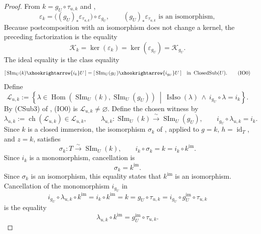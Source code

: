 \begin{proof}
  From $k=g_U\circ\tau_{u,k}$ and
  ,
  \[
    \varepsilon_k
      =\bigl((g_U)_*\varepsilon_{\tau_{u,k}}\bigr)
        \circ\varepsilon_{g_U},
    \qquad
    (g_U)_*\varepsilon_{\tau_{u,k}}\text{ is an isomorphism},
  \]
  Because postcomposition with an isomorphism does not change a kernel, the
  preceding factorization is the equality
  \[
    \mathcal K_k=\ker(\varepsilon_k)
      =\ker(\varepsilon_{g_U})=\mathcal K_{g_U}.
  \]
  The ideal equality is the class equality
  \[
    [\,\operatorname{SIm}_U(k)\xhookrightarrow{i_k}U\,]
      =[\,\operatorname{SIm}_U(g_U)\xhookrightarrow{i_{g_U}}U\,]
      \quad\text{in }\operatorname{ClosedSub}(U).                \tag{IO0}
  \]
  Define
  \[
    \mathscr L_{u,k}:=
      \left\{\lambda\in
        \operatorname{Hom}(\operatorname{SIm}_U(k),
          \operatorname{SIm}_U(g_U))
        \ \middle|\
        \operatorname{IsIso}(\lambda)\ \wedge\
        i_{g_U}\circ\lambda=i_k\right\}.
  \]
  By (CSub3) of , (IO0) is
  $\mathscr L_{u,k}\ne\varnothing$.  Define the chosen witness by
  \[
    \lambda_{u,k}:=\operatorname{ch}(\mathscr L_{u,k})
      \in\mathscr L_{u,k},
    \qquad
    \lambda_{u,k}\colon\operatorname{SIm}_U(k)
      \xrightarrow{\ \sim\ }\operatorname{SIm}_U(g_U),
    \qquad
    i_{g_U}\circ\lambda_{u,k}=i_k.
  \]
  Since $k$ is a closed immersion, the isomorphism $\sigma_k$ of
  , applied to
  $g=k$, $h=\operatorname{id}_T$, and $z=k$, satisfies
  \[
    \sigma_k\colon T\xrightarrow{\ \sim\ }\operatorname{SIm}_U(k),
    \qquad
    i_k\circ\sigma_k=k=i_k\circ k^{\mathrm{im}}.
  \]
  Since $i_k$ is a monomorphism, cancellation is
  \[
    \sigma_k=k^{\mathrm{im}}.
  \]
  Since $\sigma_k$ is an isomorphism, this equality states that
  $k^{\mathrm{im}}$ is an isomorphism.
  Cancellation of the monomorphism $i_{g_U}$ in
  \[
    i_{g_U}\circ\lambda_{u,k}\circ k^{\mathrm{im}}
      =i_k\circ k^{\mathrm{im}}
      =k
      =g_U\circ\tau_{u,k}
      =i_{g_U}\circ g_U^{\mathrm{im}}\circ\tau_{u,k}
  \]
  is the equality
  \[
    \lambda_{u,k}\circ k^{\mathrm{im}}
      =g_U^{\mathrm{im}}\circ\tau_{u,k}.
  \]


\end{proof}
